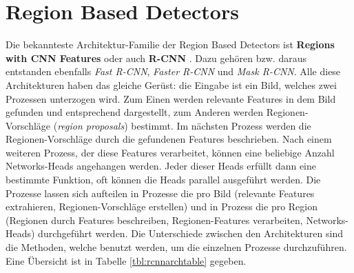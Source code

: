 \section{Region Based Detectors}\label{sec:regionBasedDetectors}
 Die bekannteste Architektur-Familie der Region Based Detectors ist \textbf{Regions with CNN Features} oder auch \textbf{R-CNN} \cite{girshick14CVPR}. Dazu gehören bzw. daraus entstanden ebenfalls \textit{Fast R-CNN}, \textit{Faster R-CNN} und \textit{Mask R-CNN}.  Alle diese Architekturen haben das gleiche Gerüst: die Eingabe ist ein Bild, welches zwei Prozessen unterzogen wird. Zum Einen werden relevante Features in dem Bild gefunden und entsprechend dargestellt, zum Anderen werden Regionen-Vorschläge (\textit{region proposals}) bestimmt. Im nächsten Prozess werden die Regionen-Vorschläge durch die gefundenen Features beschrieben. Nach einem weiteren Prozess, der diese Features verarbeitet, können eine beliebige Anzahl Networks-Heads angehangen werden. Jeder dieser Heads erfüllt dann eine bestimmte Funktion, oft können die Heads parallel ausgeführt werden.  Die Prozesse lassen sich aufteilen in Prozesse die pro Bild (relevante Features extrahieren, Regionen-Vorschläge erstellen) und in Prozess die pro Region (Regionen durch Features beschreiben, Regionen-Features verarbeiten, Networks-Heads) durchgeführt werden.\cite{generalizedrcnn} Die Unterschiede zwischen den Architekturen sind die Methoden, welche benutzt werden, um die einzelnen Prozesse durchzuführen. Eine Übersicht ist in Tabelle \ref{tbl:rcnnarchtable} gegeben.

